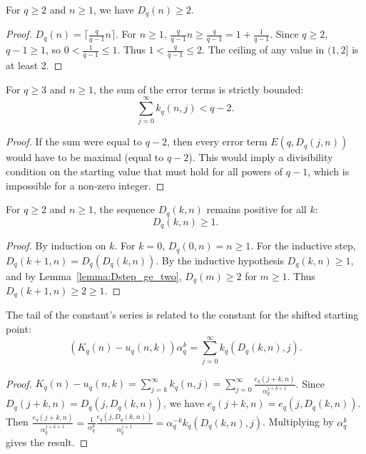 \begin{lemma}
  \label{lemma:Dstep_ge_two}
  \leanok
  For $q \ge 2$ and $n \ge 1$, we have $D_q(n) \ge 2$.
  \begin{proof}
    \leanok
    $D_q(n) = \lceil \frac{q}{q-1} n \rceil$.
    For $n \ge 1$, $\frac{q}{q-1} n \ge \frac{q}{q-1} = 1 + \frac{1}{q-1}$.
    Since $q \ge 2$, $q-1 \ge 1$, so $0 < \frac{1}{q-1} \le 1$.
    Thus $1 < \frac{q}{q-1} \le 2$. The ceiling of any value in $(1, 2]$ is at least 2.
  \end{proof}
\end{lemma}

\begin{lemma}
  \label{lemma:tsum_K_summand_lt}
  \leanok
  For $q \ge 3$ and $n \ge 1$, the sum of the error terms is strictly bounded:
  \[ \sum_{j=0}^{\infty} k_q(n, j) < q - 2. \]
  \begin{proof}
    \leanok
    If the sum were equal to $q-2$, then every error term $E(q, D_q(j, n))$ would have to be maximal (equal to $q-2$).
    This would imply a divisibility condition on the starting value that must hold for all powers of $q-1$, which is impossible for a non-zero integer.
  \end{proof}
\end{lemma}

\begin{lemma}
  \label{lemma:Diter'_pos}
  \leanok
  For $q \ge 2$ and $n \ge 1$, the sequence $D_q(k, n)$ remains positive for all $k$:
  \[ D_q(k, n) \ge 1. \]
  \begin{proof}
    \leanok
    By induction on $k$. For $k=0$, $D_q(0, n) = n \ge 1$.
    For the inductive step, $D_q(k+1, n) = D_q(D_q(k, n))$.
    By the inductive hypothesis $D_q(k, n) \ge 1$, and by Lemma~\ref{lemma:Dstep_ge_two}, $D_q(m) \ge 2$ for $m \ge 1$.
    Thus $D_q(k+1, n) \ge 2 \ge 1$.
  \end{proof}
\end{lemma}

\begin{lemma}
  \label{lemma:K_tail_eq_shifted}
  \leanok
  The tail of the constant's series is related to the constant for the shifted starting point:
  \[ (K_q(n) - u_q(n, k)) \alpha_q^k = \sum_{j=0}^{\infty} k_q(D_q(k, n), j). \]
  \begin{proof}
    \leanok
    $K_q(n) - u_q(n, k) = \sum_{j=k}^{\infty} k_q(n, j) = \sum_{j=0}^{\infty} \frac{e_q(j+k, n)}{\alpha_q^{j+k+1}}$.
    Since $D_q(j+k, n) = D_q(j, D_q(k, n))$, we have $e_q(j+k, n) = e_q(j, D_q(k, n))$.
    Then $\frac{e_q(j+k, n)}{\alpha_q^{j+k+1}} = \frac{1}{\alpha_q^k} \frac{e_q(j, D_q(k, n))}{\alpha_q^{j+1}} = \alpha_q^{-k} k_q(D_q(k, n), j)$.
    Multiplying by $\alpha_q^k$ gives the result.
  \end{proof}
\end{lemma}

